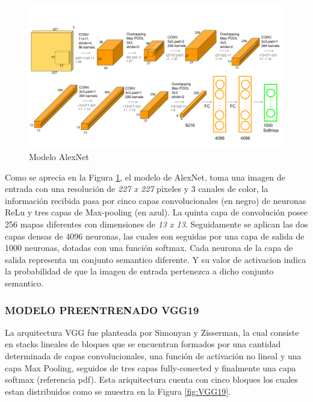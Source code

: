 				\begin{figure}[ht]
					\centering
					\includegraphics[scale=0.4]{Figs/5.png}
					\caption{Modelo AlexNet}
					\label{fig:AlexNet}
				\end{figure}
				\newpage	
				Como se aprecia en la Figura \ref{fig:AlexNet}, el modelo de AlexNet, toma una imagen de entrada con una resolución de \textit{227 x 227} pixeles y 3 canales de color, la información recibida pasa por cinco capas convolucionales (en negro) de neuronas ReLu y tres capas de Max-pooling (en azul). La quinta capa de convolución posee 256 mapas diferentes con dimensiones de \textit{13 x 13}. Seguidamente se aplican las dos capas densas de 4096 neuronas, las cuales son seguidas por una capa de salida de 1000 neuronas, dotadas con una función softmax. Cada neurona de la capa de salida representa un conjunto semantico diferente. Y su valor de activacion indica la probabilidad de que la imagen de entrada pertenezca a dicho conjunto semantico.\\
		
				
				
				


			\subsubsection{\MakeUppercase{Modelo preentrenado VGG19}}
			
				La arquitectura VGG fue planteada por Simonyan y Zisserman, la cual consiste en stacks lineales de bloques que se encuentran formados por una cantidad determinada de capas convolucionales, una función de activación no lineal y una capa Max Pooling, seguidos de tres capas fully-conected y finalmente una capa softmax (referencia pdf). Esta ariquitectura cuenta con cinco bloques los cuales estan distribuidos como se muestra en la Figura \ref{fig:VGG19}.
				

